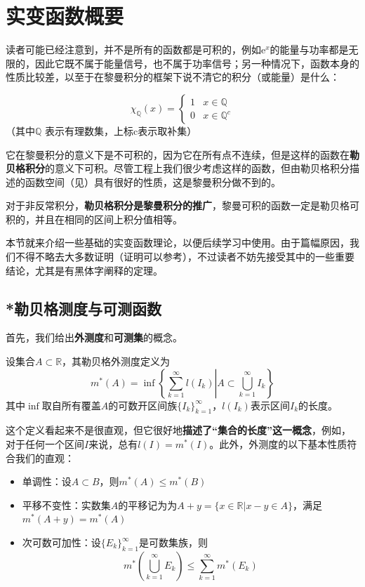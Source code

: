 \section{实变函数概要}\label{sec:Real_Analysis}

读者可能已经注意到，并不是所有的函数都是可积的，例如$\mathrm{e}^x$的能量与功率都是无限的，因此它既不属于能量信号，也不属于功率信号；另一种情况下，函数本身的性质比较差，以至于在黎曼积分的框架下说不清它的积分（或能量）是什么：
\begin{example}[狄利克雷函数]
    \[\chi_{\mathbb{Q}}(x)=
        \begin{cases}
            1 & x \in \mathbb{Q}    \\
            0 & x \in \mathbb{Q} ^c
        \end{cases}\]
    （其中$\mathbb{Q}$ 表示有理数集，上标c表示取补集）
\end{example}
它在黎曼积分的意义下是不可积的，因为它在所有点不连续，但是这样的函数在\textbf{勒贝格积分}的意义下可积。尽管工程上我们很少考虑这样的函数，但由勒贝格积分描述的函数空间（见）具有很好的性质，这是黎曼积分做不到的。

对于非反常积分，\textbf{勒贝格积分是黎曼积分的推广}，黎曼可积的函数一定是勒贝格可积的，并且在相同的区间上积分值相等。

本节就来介绍一些基础的实变函数理论，以便后续学习中使用。由于篇幅原因，我们不得不略去大多数证明（证明可以参考\cite{real_analysis}），不过读者不妨先接受其中的一些重要结论，尤其是有黑体字阐释的定理。

\subsection{*勒贝格测度与可测函数}\label{sub:lebesgue}

首先，我们给出\textbf{外测度}和\textbf{可测集}的概念。
\begin{definition}[勒贝格外测度]
    设集合$A\subset\mathbb{R}$，其勒贝格外测度定义为
    \[m^*(A)=\inf\left\{\sum_{k=1}^{\infty}l(I_k)\left|A\subset\bigcup_{k=1}^{\infty}I_k\right.\right\}\]
    其中$\inf$取自所有覆盖$A$的可数开区间族$\{I_k\}_{k=1}^{\infty}$，$l(I_k)$表示区间$I_k$的长度。
\end{definition}
这个定义看起来不是很直观，但它很好地\textbf{描述了“集合的长度”这一概念}，例如，对于任何一个区间$I$来说，总有$l(I)=m^*(I)$。此外，外测度的以下基本性质符合我们的直观：
\begin{proposition}[外测度的性质]
    \quad
    \begin{itemize}
        \item 单调性：设$A\subset B$，则$m^*(A)\leq m^*(B)$
        \item 平移不变性：实数集$A$的平移记为为$A+y=\{x\in \mathbb{R}|x-y\in A\}$，满足$m^*(A+y)=m^*(A)$
        \item 次可数可加性：设$\{E_k\}_{k=1}^{\infty}$是可数集族，则
              $$m^*\left(\bigcup_{k=1}^{\infty}E_k\right)\leq\sum_{k=1}^{\infty}m^*(E_k)$$
    \end{itemize}
\end{proposition}

